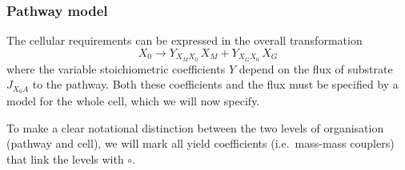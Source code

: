 \subsubsection*{Pathway model}
{}
\label{ssec_c:pathway_model}

The cellular requirements can be expressed in the overall transformation
\begin{equation} \label{eqn:t}
  X_0 \rightarrow Y_{X_M X_0} \, X_M + Y_{X_G X_0} \, X_G
\end{equation}
where the variable stoichiometric coefficients $Y$ depend on the flux of substrate $J_{X_0A}$ to the pathway. Both these coefficients and the flux must be specified by a model for the whole cell, which we will now specify.

To make a clear notational distinction between the two levels of organisation (pathway and cell), we will mark all yield coefficients (i.e.\ mass-mass couplers) that link the levels with $\circ$.

